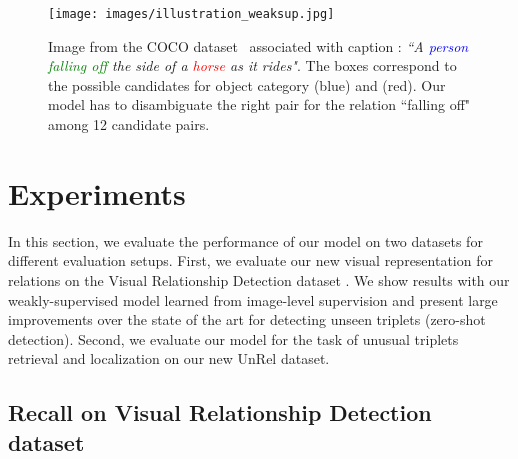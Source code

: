 \documentclass[10pt,twocolumn,letterpaper]{article}
\begin{document}
\begin{figure}[t]
	\begin{center}
   	\texttt{[image: images/illustration\_weaksup.jpg]}
	\end{center}
	\setlength\abovecaptionskip{-5pt}
   	\caption{Image from the COCO dataset~\cite{Lin2014a} associated with caption : \textit{``A \textcolor{blue}{person} \textcolor{Green}{falling off} the side of a \textcolor{red}{horse} as it rides"}. The boxes correspond to the possible candidates for object category  (blue) and  (red). Our model has to disambiguate the right pair for the relation ``falling off" among 12 candidate pairs.}
   	\vspace{-.4cm}
\label{fig:coco_weak}
\end{figure}

\section{Experiments}

In this section, we evaluate the performance of our model on two
datasets for different evaluation setups. First, we evaluate our new
visual representation for relations on the Visual Relationship
Detection dataset \cite{Lu16}. We show results with our
weakly-supervised model learned from image-level supervision and
present large improvements over the state of the art for detecting
unseen triplets (zero-shot detection). Second, we evaluate our model for the task of unusual
triplets retrieval and localization on our new UnRel dataset. 


\subsection{Recall on Visual Relationship Detection dataset}
\end{document}

